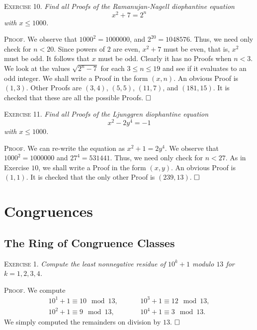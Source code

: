 \documentclass[11pt, leqno]{article}
\newcommand{\done}{\ensuremath{\hfill\square}}
\begin{document}
\textsc{Exercise 10}. \emph{Find all Proofs of the Ramanujan-Nagell diophantine equation 
\begin{displaymath}
x^2 + 7 = 2^n
\end{displaymath}
with $x \leq 1000$.}

\textsc{Proof}. We observe that $1000^2 = 1000000$, and $2^{20}  = 1048576$. Thus, we need only check for $n < 20$. Since powers of $2$ are even, $x^2 + 7$ must be even, that is, $x^2$ must be odd. It follows that $x$ must be odd. Clearly it has no Proofs when $n < 3$. We look at the values $\sqrt{2^n - 7}$ for each $3 \leq n \leq 19$ and see if it evaluates to an odd integer. We shall write a Proof in the form $(x,n)$. An obvious Proof is $(1,3)$. Other Proofs are $(3,4)$, $(5,5)$, $(11,7)$, and $(181, 15)$. It is checked that these are all the possible Proofs. \done

\textsc{Exercise 11}. \emph{Find all Proofs of the Ljunggren diophantine equation 
\begin{displaymath}
x^2 - 2y^4 = -1
\end{displaymath}
with $x \leq 1000$.}

\textsc{Proof}. We can re-write the equation as $x^2 + 1 = 2y^4$. We observe that $1000^2 = 1000000$ and $27^4 = 531441$. Thus, we need only check for $n < 27$. As in Exercise $10$, we shall write a Proof in the form $(x,y)$. An obvious Proof is $(1,1)$. It is checked that the only other Proof is $(239, 13)$. \done
\clearpage

\section{Congruences}

\subsection{The Ring of Congruence Classes}

\textsc{Exercise 1}. \emph{Compute the least nonnegative residue of $10^k + 1$ modulo $13$ for $k = 1, 2, 3, 4$.}

\textsc{Proof}. We compute 
\begin{align*}
  10^1+1 \equiv 10 \mod 13, \hspace{1cm} &10^3+1 \equiv 12 \mod 13,\\
  10^2+1 \equiv 9 \mod 13, \hspace{1cm} &10^4+1 \equiv 3 \mod 13.
\end{align*}
We simply computed the remainders on division by $13$. \done
\end{document}
